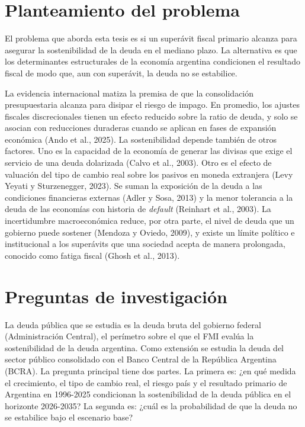 \section{Planteamiento del problema}

El problema que aborda esta tesis es si un superávit fiscal primario
alcanza para asegurar la sostenibilidad de la deuda en el mediano plazo.
La alternativa es que los determinantes estructurales de la economía
argentina condicionen el resultado fiscal de modo que, aun con
superávit, la deuda no se estabilice.

La evidencia internacional matiza la premisa de que la consolidación
presupuestaria alcanza para disipar el riesgo de impago. En promedio,
los ajustes fiscales discrecionales tienen un efecto reducido sobre la
ratio de deuda, y solo se asocian con reducciones duraderas cuando se
aplican en fases de expansión económica (Ando et al., 2025). La
sostenibilidad depende también de otros factores. Uno es la capacidad de
la economía de generar las divisas que exige el servicio de una deuda
dolarizada (Calvo et al., 2003). Otro es el efecto de valuación del tipo
de cambio real sobre los pasivos en moneda extranjera (Levy Yeyati y
Sturzenegger, 2023). Se suman la exposición de la deuda a las
condiciones financieras externas (Adler y Sosa, 2013) y la menor
tolerancia a la deuda de las economías con historia de \emph{default}
(Reinhart et al., 2003). La incertidumbre macroeconómica reduce, por
otra parte, el nivel de deuda que un gobierno puede sostener (Mendoza y
Oviedo, 2009), y existe un límite político e institucional a los
superávits que una sociedad acepta de manera prolongada, conocido como
fatiga fiscal (Ghosh et al., 2013).

\section{Preguntas de investigación}

La deuda pública que se estudia es la deuda bruta del gobierno federal
(Administración Central), el perímetro sobre el que el FMI evalúa la
sostenibilidad de la deuda argentina. Como extensión se estudia la deuda
del sector público consolidado con el Banco Central de la República
Argentina (BCRA). La pregunta principal tiene dos partes. La primera es:
¿en qué medida el crecimiento, el tipo de cambio real, el riesgo país y
el resultado primario de Argentina en 1996-2025 condicionan la
sostenibilidad de la deuda pública en el horizonte 2026-2035? La segunda
es: ¿cuál es la probabilidad de que la deuda no se estabilice bajo el
escenario base?

